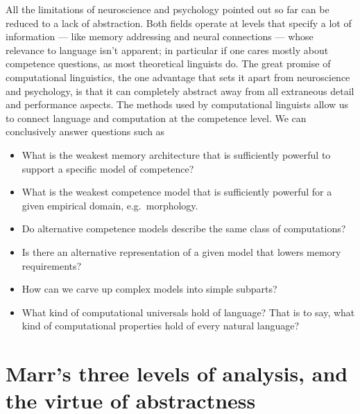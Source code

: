 All the limitations of neuroscience and psychology pointed out so far can be reduced to a lack of abstraction.
Both fields operate at levels that specify a lot of information --- like memory addressing and neural connections --- whose relevance to language isn't apparent; in particular if one cares mostly about competence questions, as most theoretical linguists do.
The great promise of computational linguistics, the one advantage that sets it apart from neuroscience and psychology, is that it can completely abstract away from all extraneous detail and performance aspects.
The methods used by computational linguists allow us to connect language and computation at the competence level. 
We can conclusively answer questions such as
%
\begin{itemize}
    \item What is the weakest memory architecture that is sufficiently powerful to support a specific model of competence?
    \item What is the weakest competence model that is sufficiently powerful for a given empirical domain, e.g.\ morphology.
    \item Do alternative competence models describe the same class of computations?
    \item Is there an alternative representation of a given model that lowers memory requirements?
    \item How can we carve up complex models into simple subparts? 
    \item What kind of computational universals hold of language?
          That is to say, what kind of computational properties hold of every natural language?
\end{itemize}


\section{Marr's three levels of analysis, and the virtue of abstractness}

